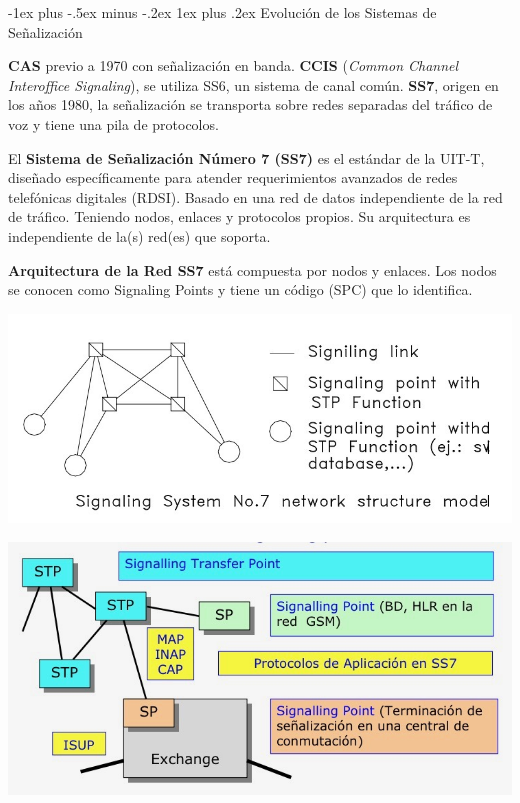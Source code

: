 \documentclass[10pt,portrait, twocolumn]{article}
\makeatletter
\renewcommand{\subsubsection}{\@startsection{subsubsection}{3}{0mm}%
                                {-1ex plus -.5ex minus -.2ex}%
                                {1ex plus .2ex}%
                                {\normalfont\small\bfseries}}
\makeatother
\begin{document}
\subsubsection{Evolución de los Sistemas de Señalización}

\textbf{CAS} previo a 1970 con señalización en banda. \textbf{CCIS} (\textit{Common Channel Interoffice Signaling}), se utiliza SS6, un sistema de canal común. \textbf{SS7}, origen en los años 1980, la señalización se transporta sobre redes separadas del tráfico de voz y tiene una pila de protocolos.


El \textbf{Sistema de Señalización Número 7 (SS7)} es el estándar de la UIT-T, diseñado específicamente para atender requerimientos avanzados de redes telefónicas digitales (RDSI). Basado en una red de datos independiente de la red de tráfico. Teniendo nodos, enlaces y protocolos propios. Su arquitectura es independiente de la(s) red(es) que soporta. 

\textbf{Arquitectura de la Red SS7} está compuesta por nodos y enlaces. Los nodos se conocen como Signaling Points y tiene un código (SPC) que lo identifica.

	\begin{center}
		\includegraphics[scale = 0.2]{SS7}
	\end{center}
	
	\begin{center}
		\includegraphics[scale = 0.2]{SP}
	\end{center}
	
\end{document}
